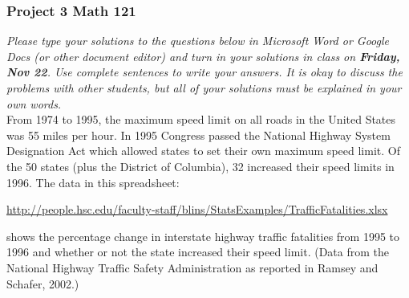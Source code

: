 \documentclass[12pt]{exam}
\begin{document}
\subsubsection*{Project 3 \hfill Math 121}

\textit{Please type your solutions to the questions below in Microsoft Word or Google Docs (or other document editor) and turn in your solutions in class on \textbf{Friday, Nov 22}. Use complete sentences to write your answers.  It is okay to discuss the problems with other students, but all of your solutions must be explained in your own words. }  \\

\noindent
From 1974 to 1995, the maximum speed limit on all roads in the United States was 55 miles per hour.  In 1995 Congress passed the National Highway System Designation Act which allowed states to set their own maximum speed limit. Of the 50 states (plus the District of Columbia), 32 increased their speed limits in 1996. The data in this spreadsheet:
\begin{center}
{\small
\url{http://people.hsc.edu/faculty-staff/blins/StatsExamples/TrafficFatalities.xlsx}
}
\end{center}
shows the percentage change in interstate highway traffic fatalities from 1995 to 1996 and whether or not the state
increased their speed limit. (Data from the National Highway Traffic Safety Administration as reported
in Ramsey and Schafer, 2002.)
\end{document}
